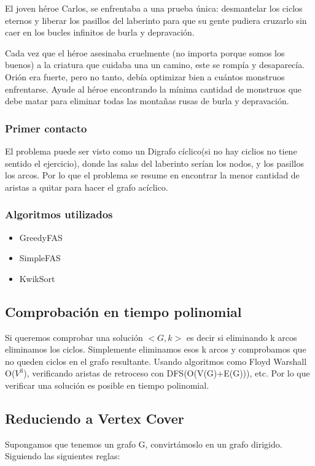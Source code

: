 \documentclass{article}
\begin{document}
El joven héroe Carlos, se enfrentaba a una prueba única: desmantelar los ciclos eternos y liberar los pasillos del laberinto para que su gente pudiera cruzarlo sin caer en los bucles infinitos de burla y depravación.

Cada vez que el héroe asesinaba cruelmente (no importa porque somos los buenos) a la criatura que cuidaba una un camino, este se rompía y desaparecía. Orión era fuerte, pero no tanto, debía optimizar bien a cuántos monstruos enfrentarse. Ayude al héroe encontrando la mínima cantidad de monstruos que debe matar para eliminar todas las montañas rusas de burla y depravación.
	\subsubsection{Primer contacto}
El problema puede ser visto como un Digrafo cíclico(si no hay ciclios no tiene sentido el ejercicio), donde las salas del laberinto serían los nodos, y los pasillos los arcos. Por lo que el problema se resume en encontrar la menor cantidad de aristas a quitar para hacer el grafo acíclico.  
	\subsubsection{Algoritmos utilizados}
	\begin{itemize}
		\item GreedyFAS
		\item SimpleFAS
		\item KwikSort	
		
	\end{itemize}
\subsection{Comprobación en tiempo polinomial}
Si queremos comprobar una solución $<G, k>$ es decir si eliminando k arcos eliminamos los ciclos. Simplemente eliminamos esos k arcos y comprobamos que no queden ciclos en el grafo resultante. Usando algoritmos como Floyd Warshall O($V^3$), verificando aristas de retroceso con DFS(O(V(G)+E(G))), etc. Por lo que verificar una solución es posible en tiempo polinomial.

\subsection{Reduciendo a Vertex Cover}
Supongamos que tenemos un grafo G, convirtámoslo en un grafo dirigido.
Siguiendo las siguientes reglas:
\end{document}
